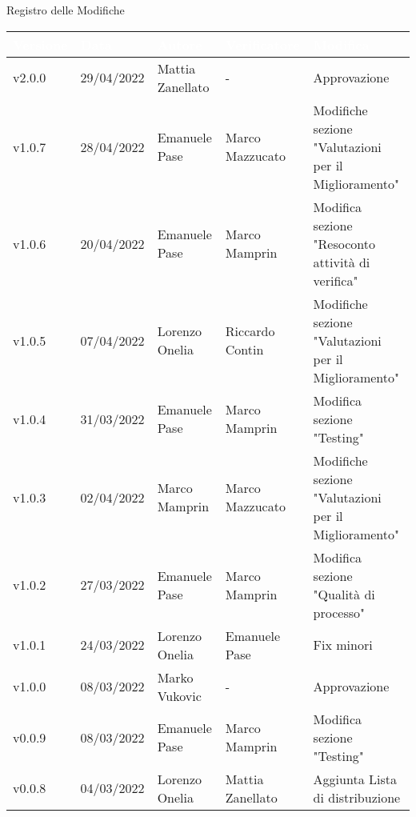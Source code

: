 \begin{center}
  \huge{Registro delle Modifiche}
\end{center}
\renewcommand\arraystretch{1,5}
{\centering
\begin{longtable}{|C{1.8cm}|C{2.1cm}|C{2cm}|C{2.4cm}|L{4.4cm}|}
  \hline
  \textcolor[HTML]{FFFFFF}{\textbf{Versione}} & \textcolor[HTML]{FFFFFF}{\textbf{Data}} & \textcolor[HTML]{FFFFFF}{\textbf{Autore}}  & \textcolor[HTML]{FFFFFF}{\textbf{Verificatore}} & \textcolor[HTML]{FFFFFF}{\textbf{Modifica}}    \\ \hline
  v2.0.0        & 29/04/2022  & Mattia Zanellato  &   -     & Approvazione                 \\ \hline
  v1.0.7        & 28/04/2022    & Emanuele Pase    &  Marco Mazzucato    & Modifiche sezione "Valutazioni per il Miglioramento"            \\ \hline
  v1.0.6        & 20/04/2022  & Emanuele Pase  &   Marco Mamprin     & Modifica sezione "Resoconto attività di verifica"                  \\ \hline
  v1.0.5        & 07/04/2022    & Lorenzo Onelia    & Riccardo Contin   & Modifiche sezione "Valutazioni per il Miglioramento"            \\ \hline
  v1.0.4        & 31/03/2022    & Emanuele Pase  &  Marco Mamprin   & Modifica sezione "Testing"                  \\ \hline
  v1.0.3       & 02/04/2022    & Marco Mamprin  &   Marco Mazzucato   & Modifiche sezione "Valutazioni per il Miglioramento"                 \\ \hline
  v1.0.2       & 27/03/2022    & Emanuele Pase  & Marco Mamprin      & Modifica sezione "Qualità di processo"                   \\ \hline
  v1.0.1       & 24/03/2022    & Lorenzo Onelia  & Emanuele Pase    & Fix minori                  \\ \hline
  v1.0.0       & 08/03/2022   & Marko Vukovic & - & Approvazione     \\ \hline
  v0.0.9       & 08/03/2022    & Emanuele Pase  & Marco Mamprin         & Modifica sezione "Testing"                   \\ \hline
  v0.0.8       & 04/03/2022    & Lorenzo Onelia  & Mattia Zanellato     & Aggiunta Lista di distribuzione                  \\ \hline

\end{longtable}}

